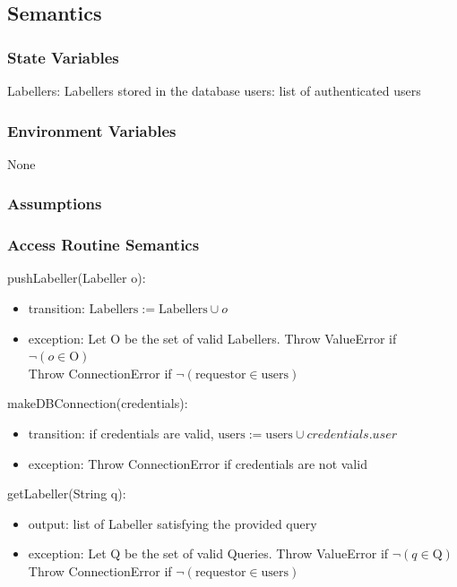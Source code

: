 \documentclass[12pt, titlepage]{article}
\begin{document}
  \subsection{Semantics}
  
  \subsubsection{State Variables}
  
  Labellers: Labellers stored in the database
  users: list of authenticated users
  
  \subsubsection{Environment Variables}
  
  None
  
  \subsubsection{Assumptions}
  
  
  \subsubsection{Access Routine Semantics}
  
  \noindent pushLabeller(Labeller o):
  \begin{itemize}
  \item transition: $\text{Labellers} := \text{Labellers} \cup o $
  \item exception: Let O be the set of valid Labellers. Throw ValueError if $\neg (o \in \text{O})$\\
  Throw ConnectionError if $\neg (\text{requestor} \in \text{users})$
  \end{itemize}

  \noindent makeDBConnection(credentials):
  \begin{itemize}
  \item transition: if credentials are valid, $\text{users} := \text{users} \cup credentials.user $
  \item exception: Throw ConnectionError if credentials are not valid
  \end{itemize}

  \noindent getLabeller(String q):
  \begin{itemize}
  \item output: list of Labeller satisfying the provided query
  \item exception: Let Q be the set of valid Queries. Throw ValueError if $\neg (q \in \text{Q})$\\
  Throw ConnectionError if $\neg (\text{requestor} \in \text{users})$

  \end{itemize}
  
\end{document}
